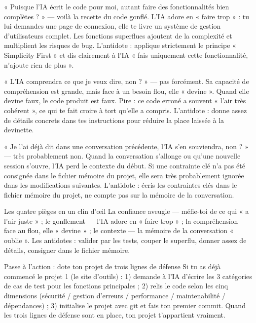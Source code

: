 
« Puisque l'IA écrit le code pour moi, autant faire des fonctionnalités bien complètes ? » — voilà la recette du code gonflé. L'IA adore en « faire trop » : tu lui demandes une page de connexion, elle te livre un système de gestion d'utilisateurs complet. Les fonctions superflues ajoutent de la complexité et multiplient les risques de bug. L'antidote : applique strictement le principe « Simplicity First » et dis clairement à l'IA « fais uniquement cette fonctionnalité, n'ajoute rien de plus ».


« L'IA comprendra ce que je veux dire, non ? » — pas forcément. Sa capacité de compréhension est grande, mais face à un besoin flou, elle « devine ». Quand elle devine faux, le code produit est faux. Pire : ce code erroné a souvent « l'air très cohérent », ce qui te fait croire à tort qu'elle a compris. L'antidote : donne assez de détails concrets dans tes instructions pour réduire la place laissée à la devinette.


« Je l'ai déjà dit dans une conversation précédente, l'IA s'en souviendra, non ? » — très probablement non. Quand la conversation s'allonge ou qu'une nouvelle session s'ouvre, l'IA perd le contexte du début. Si une contrainte clé n'a pas été consignée dans le fichier mémoire du projet, elle sera très probablement ignorée dans les modifications suivantes. L'antidote : écris les contraintes clés dans le fichier mémoire du projet, ne compte pas sur la mémoire de la conversation.

\begin{tcbwarn}{Les quatre pièges en un clin d'œil}
La confiance aveugle — méfie-toi de ce qui « a l'air juste » ; le gonflement — l'IA adore en « faire trop » ; la compréhension — face au flou, elle « devine » ; le contexte — la mémoire de la conversation « oublie ». Les antidotes : valider par les tests, couper le superflu, donner assez de détails, consigner dans le fichier mémoire.

\end{tcbwarn}

\begin{tcbpractice}{Passe à l'action : dote ton projet de trois lignes de défense}
Si tu as déjà commencé le projet 1 (le site d'outils) : 1) demande à l'IA d'écrire les 3 catégories de cas de test pour les fonctions principales ; 2) relis le code selon les cinq dimensions (sécurité / gestion d'erreurs / performance / maintenabilité / dépendances) ; 3) initialise le projet avec git et fais ton premier commit. Quand les trois lignes de défense sont en place, ton projet t'appartient vraiment.

\end{tcbpractice}

